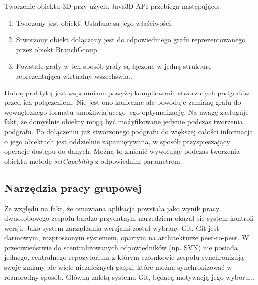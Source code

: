 Tworzenie obiektu 3D przy użyciu Java3D API przebiega następująco:
\begin{enumerate}
\item Tworzony jest obiekt. Ustalane są jego właściwości.
\item Stworzony obiekt dołączany jest do odpowiedniego grafu reprezentowanego przez obiekt BranchGroup.
\item Powstałe grafy w ten sposób grafy są łączone w jedną strukturę reprezentującą wirtualny wszechświat.
\end{enumerate}
Dobrą praktyką jest wspomniane powyżej kompilowanie stworzonych podgrafów przed ich połączeniem. Nie jest ono konieczne ale powoduje  zamianę grafu do wewnętrznego formatu umożliwiającego jego optymalizację. Na uwagę zasługuje fakt, że domyślnie obiekty mogą być modyfikowane jedynie podczas tworzenia podgrafu. Po dołączeniu już stworzonego podgrafu do większej całości informacja o jego obiektach jest oddzielnie zapamiętywana, w sposób przyspieszający operacje dostępu do danych. Można to zmienić wywołując podczas tworzenia obiektu metodę \textit{setCapability} z odpowiednim parametrem.

\subsection {Narzędzia pracy grupowej}
Ze względu na fakt, że omawiana aplikacja powstała jako wynik pracy dwuosobowego zespołu bardzo przydatnym narzędziem okazał się system kontroli wersji. Jako system zarządzania wersjami został wybrany Git.
Git jest darmowym, rozproszonym systemem, opartym na architekturze peer-to-peer. W przeciwieństwie do scentralizowanych odpowiedników (np. SVN) nie posiada jednego, centralnego repozytorium z którym członkowie zespołu synchronizują swoje zmiany ale wiele niezależnych gałęzi, które można synchronizować w różnorodny sposób. Główną zaletą systemu Git, będącą motywacją jego wyboru...






